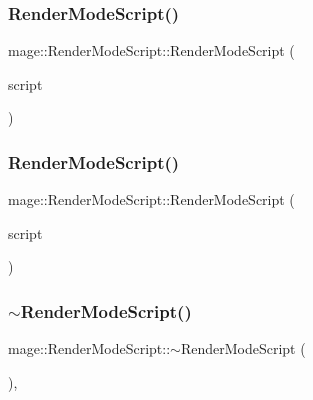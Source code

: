 \subsubsection{\texorpdfstring{Render\+Mode\+Script()}{RenderModeScript()}\hspace{0.1cm}{\footnotesize\ttfamily [2/3]}}
{\footnotesize\ttfamily mage\+::\+Render\+Mode\+Script\+::\+Render\+Mode\+Script (\begin{DoxyParamCaption}\item[{const \hyperlink{classmage_1_1_render_mode_script}{Render\+Mode\+Script} \&}]{script }\end{DoxyParamCaption})\hspace{0.3cm}{\ttfamily [delete]}}

\hypertarget{classmage_1_1_render_mode_script_aafc57a9e0066734f91db798577ee3edb}{}\label{classmage_1_1_render_mode_script_aafc57a9e0066734f91db798577ee3edb} 
\subsubsection{\texorpdfstring{Render\+Mode\+Script()}{RenderModeScript()}\hspace{0.1cm}{\footnotesize\ttfamily [3/3]}}
{\footnotesize\ttfamily mage\+::\+Render\+Mode\+Script\+::\+Render\+Mode\+Script (\begin{DoxyParamCaption}\item[{\hyperlink{classmage_1_1_render_mode_script}{Render\+Mode\+Script} \&\&}]{script }\end{DoxyParamCaption})\hspace{0.3cm}{\ttfamily [default]}}

\hypertarget{classmage_1_1_render_mode_script_a9fac374686ee177e8272b4b7ea8f83a3}{}\label{classmage_1_1_render_mode_script_a9fac374686ee177e8272b4b7ea8f83a3} 
\subsubsection{\texorpdfstring{$\sim$\+Render\+Mode\+Script()}{~RenderModeScript()}}
{\footnotesize\ttfamily mage\+::\+Render\+Mode\+Script\+::$\sim$\+Render\+Mode\+Script (\begin{DoxyParamCaption}{ }\end{DoxyParamCaption})\hspace{0.3cm}{\ttfamily [virtual]}, {\ttfamily [default]}}



